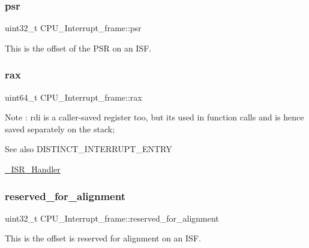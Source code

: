 \subsubsection{\texorpdfstring{psr}{psr}}
{\footnotesize\ttfamily uint32\+\_\+t C\+P\+U\+\_\+\+Interrupt\+\_\+frame\+::psr}

This is the offset of the P\+SR on an I\+SF. \mbox{\label{structCPU__Interrupt__frame_ac48eda89ac20a0f4da61af069f406a89}} 
\subsubsection{\texorpdfstring{rax}{rax}}
{\footnotesize\ttfamily uint64\+\_\+t C\+P\+U\+\_\+\+Interrupt\+\_\+frame\+::rax}

\begin{DoxyNote}{Note}
\+: rdi is a caller-\/saved register too, but it\textquotesingle{}s used in function calls and is hence saved separately on the stack;
\end{DoxyNote}
\begin{DoxySeeAlso}{See also}
D\+I\+S\+T\+I\+N\+C\+T\+\_\+\+I\+N\+T\+E\+R\+R\+U\+P\+T\+\_\+\+E\+N\+T\+RY 

\mbox{\hyperlink{group__RTEMSScoreISR_ga559fbd0c5a6dca57b0fe7a061fe96b3f}{\+\_\+\+I\+S\+R\+\_\+\+Handler}} 
\end{DoxySeeAlso}
\mbox{\label{structCPU__Interrupt__frame_aa80343232748ad4d4536e1aa7cd23c08}} 
\subsubsection{\texorpdfstring{reserved\_for\_alignment}{reserved\_for\_alignment}}
{\footnotesize\ttfamily uint32\+\_\+t C\+P\+U\+\_\+\+Interrupt\+\_\+frame\+::reserved\+\_\+for\+\_\+alignment}

This is the offset is reserved for alignment on an I\+SF. \mbox{\label{structCPU__Interrupt__frame_aa7d40cbb21b6a03bc6b7b9018c64a566}} 
